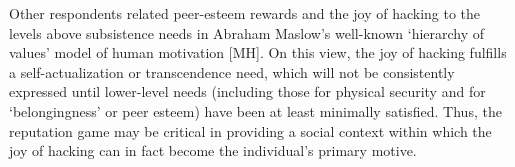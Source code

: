 Other respondents related peer-esteem rewards and the joy of hacking to the
levels above subsistence needs in Abraham Maslow's well-known `hierarchy of
values' model of human motivation [MH].  On this view, the joy of hacking
fulfills a self-actualization or transcendence need, which will not be
consistently expressed until lower-level needs (including those for physical
security and for `belongingness' or peer esteem) have been at least minimally
satisfied.  Thus, the reputation game may be critical in providing a social
context within which the joy of hacking can in fact become the individual's
primary motive.
